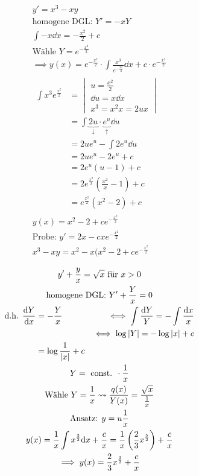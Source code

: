 \begin{bsp}
	\begin{gather*}
		y' = x^3 - xy \\
		\text{homogene DGL: } Y' = -xY \\
		\int -x \dd x = -\frac{x^2}{2} + c \\
		\text{Wähle } Y = e^{-\frac{x^2}{2}} \\
		\implies y(x) = e^{-\frac{x^2}{2}} \cdot \int \frac{x^3}{e^{-\frac{x^2}{2}}} \dd x + c \cdot e^{-\frac{x^2}{2}} \\
		\begin{split}
			\int x^3 e^{\frac{x^2}{2}}	&= \begin{vmatrix} u = \frac{x^2}{2} \\ \dd u = x \dd x \\ x^3 = x^2 x = 2ux \end{vmatrix} \\
								&= \int \underbrace{2u}_{\downarrow} \cdot \underbrace{e^u}_{\uparrow} \dd u \\
								&= 2ue^u - \int 2 e^u \dd u \\
								&= 2ue^u - 2e^u + c \\
								&= 2e^u(u-1) + c \\
								&= 2e^{\frac{x^2}{2}} (\frac{x^2}{x} - 1) + c \\
								&= e^{\frac{x^2}{2}} (x^2 - 2) + c
		\end{split} \\
		y(x) = x^2 - 2 + c e^{-\frac{x^2}{2}} \\
		\text{Probe: } y' = 2x - cxe^{-\frac{x^2}{2}} \\
		x^3 - xy = x^2 - x(x^2 - 2 + ce^{-\frac{x^2}{2}}
	\end{gather*}
\end{bsp}
\begin{bsp}
	\begin{gather*}
		y' + \frac{y}{x} = \sqrt{x} \text{ für } x > 0 \\
		\text{homogene DGL: } Y' + \frac{Y}{x} = 0 \\
		\begin{aligned}
			\text{d.h. } \frac{\dd Y}{\dd x}	&= -\frac{Y}{x} 	&\iff \int \frac{\dd Y}{Y} = -\int \frac{\dd x}{x} \\
									&			&\iff \log\abs{Y} = -\log\abs{x} + c \\
									&= \log\frac{1}{\abs{x}} + c 
		\end{aligned} \\
		Y = \text{ const. } \cdot \frac{1}{x} \\
		\text{Wähle } Y = \frac{1}{x} \rightsquigarrow \frac{q(x)}{Y(x)} = \frac{\sqrt{x}}{\frac{1}{x}} \\
		\text{Ansatz: } y = u \frac{1}{x} \\
		y(x) = \frac{1}{x} \int x^{\frac{3}{2}} \dd x + \frac{c}{x} = \frac{1}{x} \left( \frac{2}{3} x^{\frac{5}{2}} \right) + \frac{c}{x} \\
		\implies y(x) = \frac{2}{3} x^{\frac{3}{2}} + \frac{c}{x}
	\end{gather*}
\end{bsp}

